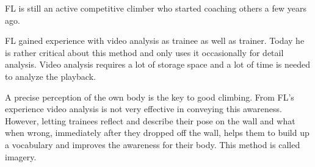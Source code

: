 FL is still an active competitive climber who started coaching others a few years ago.

FL gained experience with video analysis as trainee as well as trainer. Today he is rather critical about this method and only uses it occasionally for detail analysis. Video analysis requires a lot of storage space and a lot of  time is needed to analyze the playback.

A precise perception of the own body is the key to good climbing. From FL's experience video analysis is not very effective in conveying this awareness. However, letting trainees reflect and describe their pose on the wall and what when wrong, immediately after they dropped off the wall, helps them to build up a vocabulary and improves the awareness for their body. This method is called imagery.
